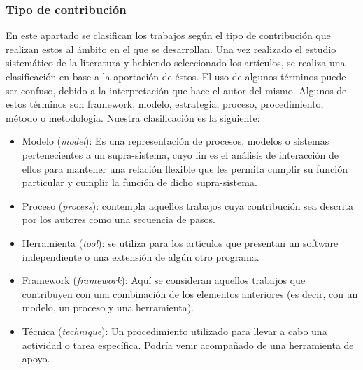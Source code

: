 \subsubsection{Tipo de contribución}
En este apartado se clasifican los trabajos según el tipo de contribución que realizan estos al ámbito en el que se desarrollan. Una vez realizado el estudio sistemático de la literatura y habiendo seleccionado los artículos, se realiza una clasificación en base a la aportación de éstos. El uso de algunos términos puede ser confuso, debido a la interpretación que hace el autor del mismo. Algunos de estos términos son framework, modelo, estrategia, proceso, procedimiento, método o metodología. Nuestra clasificación es la siguiente:
\begin{itemize}
\item Modelo (\emph{model}): Es una representación de procesos, modelos o sistemas pertenecientes a un supra-sistema, cuyo fin es el análisis de interacción de ellos para mantener una relación flexible que les permita cumplir su función particular y cumplir la función de dicho supra-sistema.
\item Proceso (\emph{process}): contempla aquellos trabajos cuya contribución sea descrita por los autores como una secuencia de pasos.
\item Herramienta (\emph{tool}): se utiliza para los artículos que presentan un software independiente o una extensión de algún otro programa.
\item Framework (\emph{framework}): Aquí se consideran aquellos trabajos que contribuyen con una combinación de los elementos anteriores (es decir, con un modelo, un proceso y una herramienta).
\item Técnica (\emph{technique}): Un procedimiento utilizado para llevar a cabo una actividad o tarea específica. Podría venir acompañado de una herramienta de apoyo.
\end{itemize}

